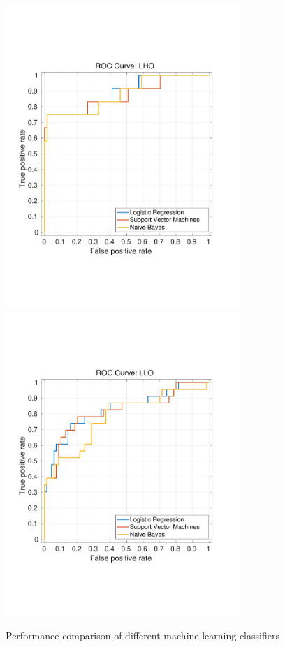 \documentclass[reprint, prl, aps, showpacs]{revtex4-1}
\begin{document}
\begin{figure}[t]
\hspace*{-0.5cm}
 \includegraphics[width=3.5in, trim = 0 4.5cm 0 4.5cm, clip=true]{lho_lockloss_ROC.pdf}
  \includegraphics[width=3.5in, trim = 0 4.5cm 0 4.5cm, clip=true]{llo_lockloss_ROC.pdf}
 \caption{Performance comparison of different machine learning classifiers}
 \label{fig:MLA_comparison}
\end{figure}
\end{document}
